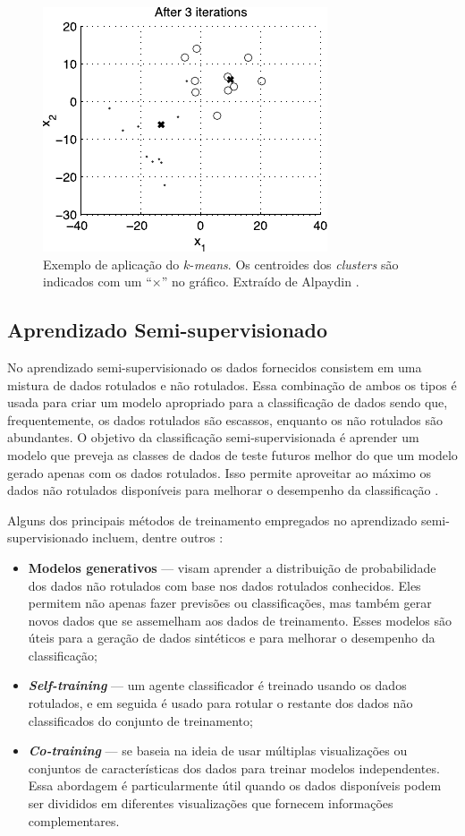 \documentclass[
	12pt,				%
	openright,			%
	twoside,			%
	a4paper,			%
	tcc,			%
	]{ABNT-DC-UEL}
\begin{document}
\begin{figure}[hbt]
    \centering
    \includegraphics[width=.5\textwidth]{k-means}
    \caption{Exemplo de aplicação do $k$-\textit{means}. Os centroides dos \textit{clusters} são indicados com um ``$\times$'' no gráfico. Extraído de Alpaydin \cite{alpaydin:20}.}
    \label{fig:k-means}
\end{figure}

\subsection{Aprendizado Semi-supervisionado}

No aprendizado semi-supervisionado os dados fornecidos consistem em uma mistura de dados rotulados e não rotulados. Essa combinação de ambos os tipos é usada para criar um modelo apropriado para a classificação de dados sendo que, frequentemente, os dados rotulados são escassos, enquanto os não rotulados são abundantes. O objetivo da classificação semi-supervisionada é aprender um modelo que preveja as classes de dados de teste futuros melhor do que um modelo gerado apenas com os dados rotulados. Isso permite aproveitar ao máximo os dados não rotulados disponíveis para melhorar o desempenho da classificação \cite{mohammed:16}.

Alguns dos principais métodos de treinamento empregados no aprendizado semi-supervisionado incluem, dentre outros \cite{prakash:14, vanengelen:20}: 

\begin{itemize}
    \item \textbf{Modelos generativos} --- visam aprender a distribuição de probabilidade dos dados não rotulados com base nos dados rotulados conhecidos. Eles permitem não apenas fazer previsões ou classificações, mas também gerar novos dados que se assemelham aos dados de treinamento. Esses modelos são úteis para a geração de dados sintéticos e para melhorar o desempenho da classificação;
    \item \textit{\textbf{Self-training}} --- um agente classificador é treinado usando os dados rotulados, e em seguida é usado para rotular o restante dos dados não classificados do conjunto de treinamento;
    \item \textit{\textbf{Co-training}} --- se baseia na ideia de usar múltiplas visualizações ou conjuntos de características dos dados para treinar modelos independentes. Essa abordagem é particularmente útil quando os dados disponíveis podem ser divididos em diferentes visualizações que fornecem informações complementares.
\end{itemize}
\end{document}
